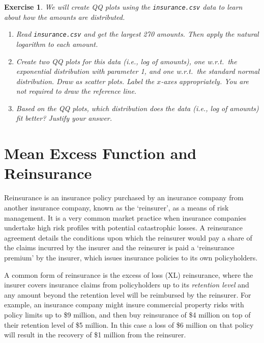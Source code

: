 \documentclass[12pt]{article}
\newtheorem{exercise}{Exercise}[section]
\begin{document}
\begin{tcolorbox}[progExe]
\begin{exercise}
\label{exe:real-qq}
We will create QQ plots using the \texttt{insurance.csv} data
to learn about how the amounts are distributed.
\begin{enumerate}
\item Read \texttt{insurance.csv} and get the largest 270 amounts.
    Then apply the natural logarithm to each amount.
\item Create two QQ plots for this data (i.e., log of amounts),
    one w.r.t.~the exponential distribution with parameter 1,
    and one w.r.t.~the standard normal distribution.
    Draw as scatter plots. Label the $x$-axes appropriately.
    You are not required to draw the reference line.
\item Based on the QQ plots, which distribution does the data (i.e., log of amounts) fit better?
    Justify your answer.
\end{enumerate}
\end{exercise}
\end{tcolorbox}

\section{Mean Excess Function and Reinsurance}

Reinsurance is an insurance policy purchased by an insurance company from another insurance company,
known as the `reinsurer', as a means of risk management.
It is a very common market practice when insurance companies
undertake high risk profiles with potential catastrophic losses.
A reinsurance agreement details the conditions upon which the reinsurer
would pay a share of the claims incurred by the insurer
and the reinsurer is paid a `reinsurance premium' by the insurer,
which issues insurance policies to its own policyholders.

A common form of reinsurance is the excess of loss (XL) reinsurance,
where the insurer covers insurance claims from policyholders up to its \emph{retention level}
and any amount beyond the retention level will be reimbursed by the reinsurer.
For example, an insurance company might insure commercial property risks with
policy limits up to \$9 million, and then buy reinsurance of \$4 million
on top of their retention level of \$5 million.
In this case a loss of \$6 million on that policy will result in
the recovery of \$1 million from the reinsurer.
\end{document}
